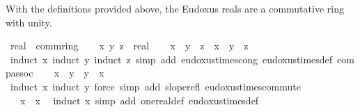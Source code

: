 \begin{isabellebody}
\endisatagproof
{\isafoldproof}%
%
\isadelimproof
%
\endisadelimproof
%
\begin{isamarkuptext}%
With the definitions provided above, the Eudoxus reals are a commutative ring with unity.%
\end{isamarkuptext}\isamarkuptrue%
\isamarkupfalse%
\ real\ {\isacharcolon}{\kern0pt}{\isacharcolon}{\kern0pt}\ comm{\isacharunderscore}{\kern0pt}ring{\isacharunderscore}{\kern0pt}{}\isanewline
%
\isadelimproof
%
\endisadelimproof
%
\isatagproof
{}\isamarkupfalse%
\isanewline
\ \ \isamarkupfalse%
\ x\ y\ z\ {\isacharcolon}{\kern0pt}{\isacharcolon}{\kern0pt}\ real\isanewline
\ \ \isamarkupfalse%
\ {\isachardoublequoteopen}x\ {\isacharasterisk}{\kern0pt}\ y\ {\isacharasterisk}{\kern0pt}\ z\ {\isacharequal}{\kern0pt}\ x\ {\isacharasterisk}{\kern0pt}\ {\isacharparenleft}{\kern0pt}y\ {\isacharasterisk}{\kern0pt}\ z{\isacharparenright}{\kern0pt}{\isachardoublequoteclose}\ \isamarkupfalse%
\ {\isacharparenleft}{\kern0pt}induct\ x{\isacharcomma}{\kern0pt}\ induct\ y{\isacharcomma}{\kern0pt}\ induct\ z{\isacharparenright}{\kern0pt}\ {\isacharparenleft}{\kern0pt}simp\ add{\isacharcolon}{\kern0pt}\ eudoxus{\isacharunderscore}{\kern0pt}times{\isacharunderscore}{\kern0pt}cong\ eudoxus{\isacharunderscore}{\kern0pt}times{\isacharunderscore}{\kern0pt}def\ comp{\isacharunderscore}{\kern0pt}assoc{\isacharparenright}{\kern0pt}\isanewline
\ \ \isamarkupfalse%
\ {\isachardoublequoteopen}x\ {\isacharasterisk}{\kern0pt}\ y\ {\isacharequal}{\kern0pt}\ y\ {\isacharasterisk}{\kern0pt}\ x{\isachardoublequoteclose}\ \isamarkupfalse%
\ {\isacharparenleft}{\kern0pt}induct\ x{\isacharcomma}{\kern0pt}\ induct\ y{\isacharparenright}{\kern0pt}\ {\isacharparenleft}{\kern0pt}force\ simp\ add{\isacharcolon}{\kern0pt}\ slope{\isacharunderscore}{\kern0pt}refl\ eudoxus{\isacharunderscore}{\kern0pt}times{\isacharunderscore}{\kern0pt}commute{\isacharparenright}{\kern0pt}\isanewline
\ \ \isamarkupfalse%
\ {\isachardoublequoteopen}{}\ {\isacharasterisk}{\kern0pt}\ x\ {\isacharequal}{\kern0pt}\ x{\isachardoublequoteclose}\ \isamarkupfalse%
\ {\isacharparenleft}{\kern0pt}induct\ x{\isacharparenright}{\kern0pt}\ {\isacharparenleft}{\kern0pt}simp\ add{\isacharcolon}{\kern0pt}\ one{\isacharunderscore}{\kern0pt}real{\isacharunderscore}{\kern0pt}def\ eudoxus{\isacharunderscore}{\kern0pt}times{\isacharunderscore}{\kern0pt}def{\isacharparenright}{\kern0pt}\isanewline
\ \ \isamarkupfalse%

\end{isabellebody}
